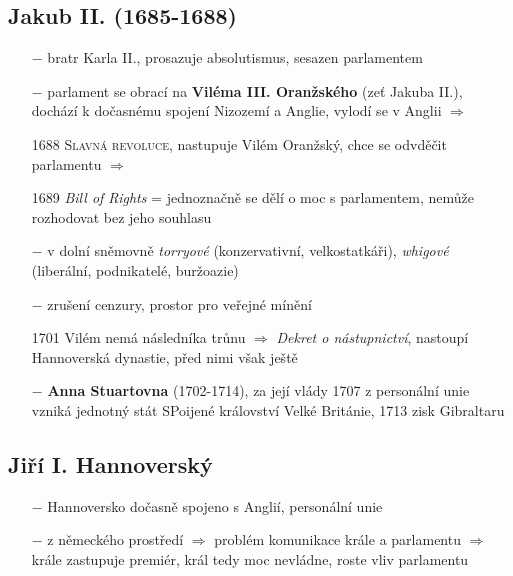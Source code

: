 \documentclass{article}
\begin{document}
\subsection*{Jakub II. (1685-1688)}
\begin{itemize}
    \vspace{-0.5em}
    \setlength\itemsep{0.15em}
    \item[$-$] bratr Karla II., prosazuje absolutismus, sesazen parlamentem
    \item[$-$] parlament se obrací na \textbf{Viléma III. Oranžského} (zeť Jakuba II.), dochází k dočasnému spojení Nizozemí a Anglie, vylodí se v Anglii $\Rightarrow$
    \item[1688] \textsc{Slavná revoluce}, nastupuje Vilém Oranžský, chce se odvděčit parlamentu $\Rightarrow$
    \item[1689] \textit{Bill of Rights} = jednoznačně se dělí o moc s parlamentem, nemůže rozhodovat bez jeho souhlasu
    \item[$-$] v dolní sněmovně \textit{torryové} (konzervativní, velkostatkáři), \textit{whigové} (liberální, podnikatelé, buržoazie)
    \item[$-$] zrušení cenzury, prostor pro veřejné mínění
    \item[1701] Vilém nemá následníka trůnu $\Rightarrow$ \textit{Dekret o nástupnictví}, nastoupí Hannoverská dynastie, před nimi však ještě
    \item[$-$] \textbf{Anna Stuartovna} (1702-1714), za její vlády 1707 z personální unie vzniká jednotný stát SPoijené království Velké Británie, 1713 zisk Gibraltaru
\end{itemize}

\subsection*{Jiří I. Hannoverský}
\begin{itemize}
    \vspace{-0.5em}
    \setlength\itemsep{0.15em}
    \item[$-$] Hannoversko dočasně spojeno s Anglií, personální unie
    \item[$-$] z německého prostředí $\Rightarrow$ problém komunikace krále a parlamentu $\Rightarrow$ krále zastupuje premiér, král tedy moc nevládne, roste vliv parlamentu
\end{itemize}
\end{document}
